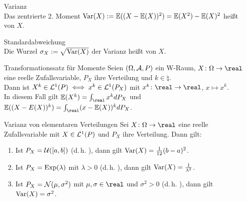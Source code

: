 \begin{Def}{Varianz}\\
    Das zentrierte 2. Moment $\text{Var}(X) := \mathbb{E}((X - \mathbb{E}(X))^2) = \mathbb{E}(X^2) - \mathbb{E}(X)^2$
    heißt  von $X$.
\end{Def}

\begin{Def}{Standardabweichung}\\
    Die Wurzel $\sigma_X := \sqrt{\text{Var}(X)}$ der Varianz heißt  von $X$.
\end{Def}

\linie

\begin{Satz}{Transformationssatz für Momente}
    Seien $(\Omega, \mathcal{A}, P)$ ein W-Raum, $X\colon \Omega \rightarrow \real$ eine reelle
    Zufallsvariable, $P_X$ ihre Verteilung und $k \in \natural$.\\
    Dann ist $X^k \in \mathcal{L}^1(P) \iff x^k \in \mathcal{L}^1(P_X)$ mit $x^k\colon \real \rightarrow \real$,
    $x \mapsto x^k$.\\
    In diesem Fall gilt $\EW(X^k) = \int_\real x^k dP_X$ und
    $\EW((X - E(X))^k) = \int_\real (x - \EW(X))^k dP_X$.
\end{Satz}

\begin{Satz}{Varianz von elementaren Verteilungen}
    Sei $X\colon \Omega \rightarrow \real$ eine reelle Zufallsvariable mit $X \in \mathcal{L}^1(P)$
    und $P_X$ ihre Verteilung.
    Dann gilt:
    \begin{enumerate}
        \item
        Ist $P_X = \mathcal{U}([a, b])$ (d.\,h. ),
        dann gilt $\text{Var}(X) = \frac{1}{12} (b - a)^2$.

        \item
        Ist $P_X = \text{Exp}(\lambda)$ mit $\lambda > 0$ (d.\,h. ),
        dann gilt $\text{Var}(X) = \frac{1}{\lambda^2}$.

        \item
        Ist $P_X = \mathcal{N}(\mu, \sigma^2)$ mit $\mu, \sigma \in \real$ und $\sigma^2 > 0$
        (d.\,h. ),
        dann gilt $\text{Var}(X) = \sigma^2$.
    \end{enumerate}
\end{Satz}

